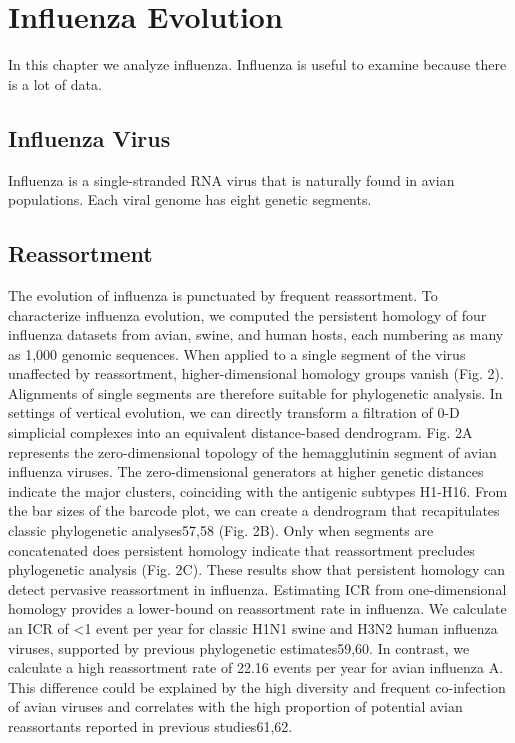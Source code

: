 \chapter{Influenza Evolution}
\label{ch:influenza}

In this chapter we analyze influenza.
Influenza is useful to examine because there is a lot of data.

\section{Influenza Virus}

Influenza is a single-stranded RNA virus that is naturally found in avian populations.
Each viral genome has eight genetic segments.

\section{Reassortment}

The evolution of influenza is punctuated by frequent reassortment.
To characterize influenza evolution, we computed the persistent homology of four influenza datasets from avian, swine, and human hosts, each numbering as many as 1,000 genomic sequences.
When applied to a single segment of the virus unaffected by reassortment, higher-dimensional homology groups vanish (Fig. 2).
Alignments of single segments are therefore suitable for phylogenetic analysis.
In settings of vertical evolution, we can directly transform a filtration of 0-D simplicial complexes into an equivalent distance-based dendrogram.
 Fig. 2A represents the zero-dimensional topology of the hemagglutinin segment of avian influenza viruses. 
 The zero-dimensional generators at higher genetic distances indicate the major clusters, coinciding with the antigenic subtypes H1-H16.
 From the bar sizes of the barcode plot, we can create a dendrogram that recapitulates classic phylogenetic analyses57,58 (Fig. 2B).
 Only when segments are concatenated does persistent homology indicate that reassortment precludes phylogenetic analysis (Fig. 2C).
 These results show that persistent homology can detect pervasive reassortment in influenza.
 Estimating ICR from one-dimensional homology provides a lower-bound on reassortment rate in influenza.
 We calculate an ICR of <1 event per year for classic H1N1 swine and H3N2 human influenza viruses, supported by previous phylogenetic estimates59,60.
 In contrast, we calculate a high reassortment rate of 22.16 events per year for avian influenza A.
This difference could be explained by the high diversity and frequent co-infection of avian viruses and correlates with the high proportion of potential avian reassortants reported in previous studies61,62.

